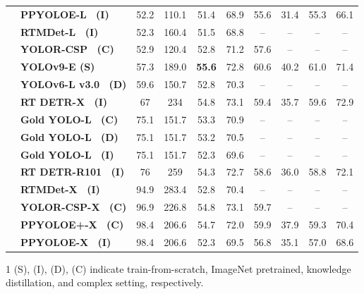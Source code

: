 \documentclass[10pt,twocolumn,letterpaper]{article}
\begin{document}
\begin{table}[t]
\begin{threeparttable}[t]
\begin{tabular}{l|lcccccccc}
				& \textbf{PPYOLOE-L~\cite{xu2022pp} (I)} & 52.2 & 110.1 & 51.4 & 68.9 & 55.6 & 31.4 & 55.3 & 66.1 \\
				& \textbf{RTMDet-L~\cite{lyu2022rtmdet} (I)} & 52.3 & 160.4 & 51.5 & 68.8 & -- & -- & -- & -- \\
				& \textbf{YOLOR-CSP~\cite{wang2021you} (C)} & 52.9 & 120.4 & 52.8 & 71.2 & 57.6 & -- & -- & -- \\
				& \textbf{YOLOv9-E (S)} & 57.3 & 189.0 & \textbf{55.6} & 72.8 & 60.6 & 40.2 & 61.0 & 71.4 \\
				& \textbf{YOLOv6-L v3.0~\cite{li2023yolov6} (D)} & 59.6 & 150.7 & 52.8 & 70.3 & -- & -- & -- & -- \\
				& \textbf{RT DETR-X~\cite{lv2023detrs} (I)} & 67 & 234 & 54.8 & 73.1 & 59.4 & 35.7 & 59.6 & 72.9 \\
				& \textbf{Gold YOLO-L~\cite{wang2023gold} (C)} & 75.1 & 151.7 & 53.3 & 70.9 & -- & -- & -- & -- \\
				& \textbf{Gold YOLO-L~\cite{wang2023gold} (D)} & 75.1 & 151.7 & 53.2 & 70.5 & -- & -- & -- & -- \\	
				& \textbf{Gold YOLO-L~\cite{wang2023gold} (I)} & 75.1 & 151.7 & 52.3 & 69.6 & -- & -- & -- & -- \\
				& \textbf{RT DETR-R101~\cite{lv2023detrs} (I)} & 76 & 259 & 54.3 & 72.7 & 58.6 & 36.0 & 58.8 & 72.1 \\
				& \textbf{RTMDet-X~\cite{lyu2022rtmdet} (I)} & 94.9 & 283.4 & 52.8 & 70.4 & -- & -- & -- & -- \\
				& \textbf{YOLOR-CSP-X~\cite{wang2021you} (C)} & 96.9 & 226.8 & 54.8 & 73.1 & 59.7 &--  & -- & -- \\
				& \textbf{PPYOLOE+-X~\cite{xu2022pp} (C)} & 98.4 & 206.6 & 54.7 & 72.0 & 59.9 & 37.9 & 59.3 & 70.4 \\	
				& \textbf{PPYOLOE-X~\cite{xu2022pp} (I)} & 98.4 & 206.6 & 52.3 & 69.5 & 56.8 & 35.1 & 57.0 & 68.6 \\
				\bottomrule
			\end{tabular}
			\begin{tablenotes}[flushleft]
			\footnotesize
			\item[1] (S), (I), (D), (C) indicate train-from-scratch, ImageNet pretrained, knowledge distillation, and complex setting, respectively.
			\end{tablenotes}
		\end{threeparttable}
	\end{table}
	
	\newpage
	
\end{document}
